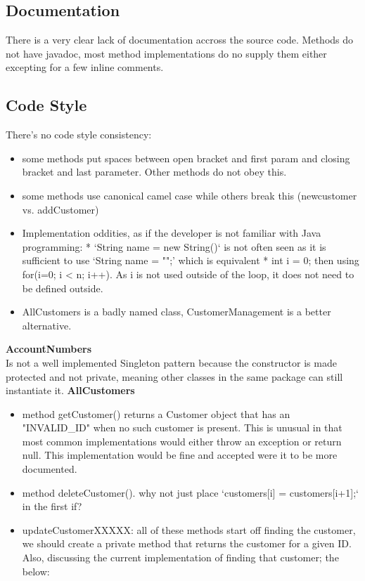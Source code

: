 \subsection{Documentation}
There is a very clear lack of documentation accross the source code. Methods do not have javadoc, most method implementations do no supply them either excepting for a few inline comments. 

\subsection{Code Style}
There's no code style consistency: 
\begin{itemize}
    \item some methods put spaces between open bracket and first param and closing bracket and last parameter. Other methods do not obey this. 
    \item some methods use canonical camel case while others break this (newcustomer vs. addCustomer)
    \item Implementation oddities, as if the developer is not familiar with Java programming: 
        * `String name = new String()` is not often seen as it is sufficient to use `String name = "";' which is equivalent
        * int i = 0; then using for(i=0; i < n; i++). As i is not used outside of the loop, it does not need to be defined outside. 
    \item AllCustomers is a badly named class, CustomerManagement is a better alternative. 
\end{itemize}
\textbf{AccountNumbers\\}
Is not a well implemented Singleton pattern because the constructor is made protected and not private, meaning other classes in the same package can still instantiate it.
\textbf{AllCustomers}
\begin{itemize}
    \item method getCustomer() returns a Customer object that has an "INVALID\_ID" when no such customer is present. This is unusual in that most common implementations would either throw an exception or return null. This implementation would be fine and accepted were it to be more documented. 

    \item method deleteCustomer(). why not just place `customers[i] = customers[i+1];` in the first if? 

    \item updateCustomerXXXXX: all of these methods start off finding the customer, we should create a private method that returns the customer for a given ID. Also, discussing the current implementation of finding that customer; the below: 
\end{itemize}

